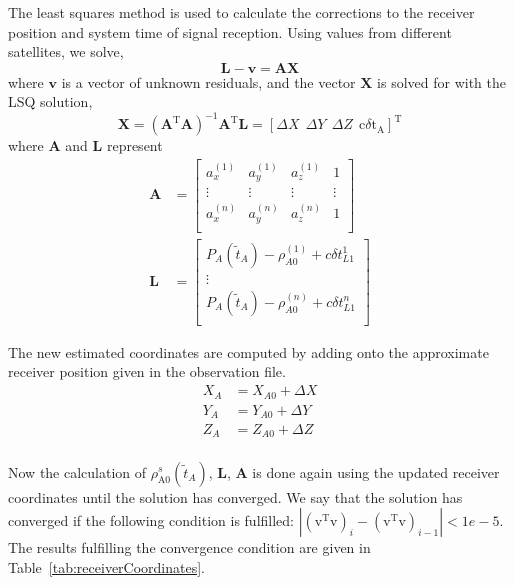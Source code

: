 The least squares method is used to calculate the corrections to the receiver position and system time of signal reception. Using values from different satellites, we solve, 
\begin{equation*}
	\mathbf{L} - \mathbf{v} = \mathbf{AX} 
\end{equation*}
where $\mathbf{v}$ is a vector of unknown residuals, and the vector $\mathbf{X}$ is solved for with the LSQ solution, 
\begin{equation*}
	\mathbf{X} = (\mathbf{A}^\text{T} \mathbf{A})^{-1} \mathbf{A}^\text{T} \mathbf{L} = [\Delta X~~\Delta Y~~\Delta Z~~\text{c} \delta \text{t}_\text{A} ]^\text{T}
\end{equation*}
where $\mathbf{A}$ and $\mathbf{L}$ represent 
\begin{align*}
	\mathbf{A} &= 
	\begin{bmatrix}
		a_x^{(1)} & a_y^{(1)} & a_z^{(1)} &1 \\
		\vdots &\vdots &\vdots &\vdots \\
		a_x^{(n)} & a_y^{(n)} & a_z^{(n)} &1 \\
	\end{bmatrix}
	\\
	\mathbf{L} &= 
	\begin{bmatrix}
		P_A(\tilde{t}_A)-\rho_{A0}^{(1)} + c \delta t_{L1}^1\\
		\vdots \\
		P_A(\tilde{t}_A)-\rho_{A0}^{(n)} + c \delta t_{L1}^n\\
	\end{bmatrix}
\end{align*}

The new estimated coordinates are computed by adding onto the approximate receiver position given in the observation file. 
\begin{align*}
	X_A &= X_{A0} + \Delta X \\
	Y_A &= Y_{A0} + \Delta Y \\
	Z_A &= Z_{A0} + \Delta Z \\
\end{align*}

Now the calculation of $\rho _{\text{A0}}^s\left(\tilde{t}_A\right)$, $\mathbf{L}$, $\mathbf{A}$ is done again using the updated receiver coordinates until the solution has converged.  We say that the solution has converged if the following condition is fulfilled: $|(\text{v}^{\text{T}} \text{v})_i - (\text{v}^{\text{T}} \text{v})_{i-1}|< 1e-5$.  The results fulfilling the convergence condition are given in Table~\ref{tab:receiverCoordinates}.

